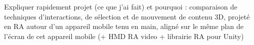 Expliquer rapidement projet (ce que j'ai fait) et pourquoi : comparaison de techniques d'interactions, de sélection et de mouvement de contenu 3D, projeté en RA autour d'un appareil mobile tenu en main, aligné sur le même plan de l'écran de cet appareil mobile (+ HMD RA video + librairie RA pour Unity)